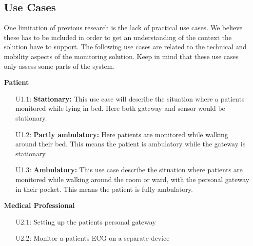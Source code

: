 

\subsection{Use Cases} %
\label{ssub:use_cases}

One limitation of previous research is the lack of practical use cases. We believe these has to be included in order to get an understanding of the context the solution have to support. The following use cases are related to the technical and mobility aspects of the monitoring solution. Keep in mind that these use cases only assess some parts of the system.

\newline
\noindent
\textbf{Patient}

\begin{enumerate}

  \item[\textsc{U1.1}:]\textbf{Stationary:} This use case will describe the situation where a patients monitored while lying in bed. Here both gateway and sensor would be stationary.

  \item[\textsc{U1.2}:]\textbf{Partly ambulatory:} Here patients are monitored while walking around their bed. This means the patient is ambulatory while the gateway is stationary.

  \item[\textsc{U1.3}:]\textbf{Ambulatory:} This use case describe the situation where patients are monitored while walking around the room or ward, with the personal gateway in their pocket. This means the patient is fully ambulatory.

\end{enumerate}

\newline
\noindent
\textbf{Medical Professional}
\begin{enumerate}

  \item[\textsc{U2.1}:] Setting up the patients personal gateway
  \item[\textsc{U2.2}:] Monitor a patients ECG on a separate device

\end{enumerate}

